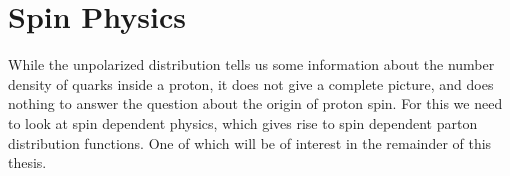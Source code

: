\documentclass[letterpaper, abstract = on,listof=totoc, bibliography=totoc]{scrreprt}
\begin{document}
%

\chapter{Spin Physics}
While the unpolarized distribution tells us some information about the number density of quarks inside a proton, it does not give a complete picture, and does nothing to answer the question about the origin of proton spin. For this we need to look at spin dependent physics, which gives rise to spin dependent parton distribution functions. One of which will be of interest in the remainder of this thesis. 
\end{document}
